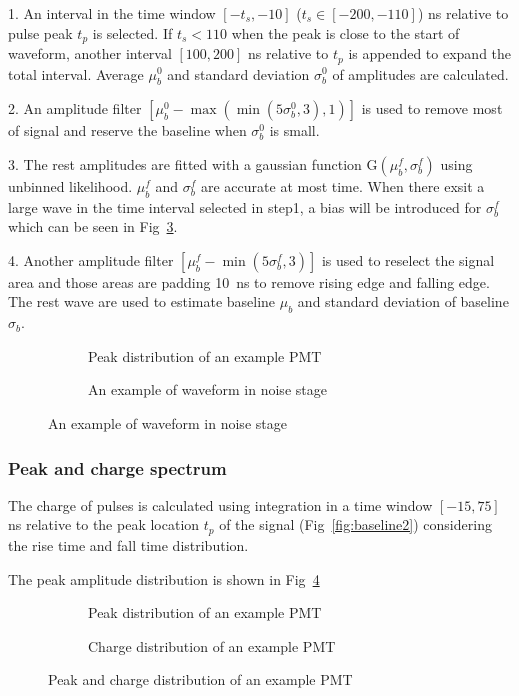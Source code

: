 1. An interval in the time window $[-t_s,-10]$ ($t_s\in[-200,-110]$) ns relative to pulse peak $t_p$ is selected. If $t_s<110$ when the peak is close to the start of waveform, another interval $[100,200]$ ns relative to $t_p$ is appended to expand the total interval. Average $\mu_b^0$ and standard deviation $\sigma_b^0$ of amplitudes are calculated.

2. An amplitude filter $[\mu_b^0-\max(\min(5\sigma_b^0,3),1)]$ is used to remove most of signal and reserve the baseline when $\sigma_b^0$ is small.

3. The rest amplitudes are fitted with a gaussian function G$(\mu_b^f,\sigma_b^f)$ using unbinned likelihood. $\mu_b^f$ and $\sigma_b^f$ are accurate at most time. When there exsit a large wave in the time interval selected in step1, a bias will be introduced for $\sigma_b^f$ which can be seen in Fig~\ref{fig:baselineBias2}.

4. Another amplitude filter $[\mu_b^f-\min(5\sigma_b^f,3)]$ is used to reselect the signal area and those areas are padding \SI{10}{ns} to remove rising edge and falling edge. The rest wave are used to estimate baseline $\mu_b$ and standard deviation of baseline $\sigma_b$.
\begin{figure}
    \centering
    \begin{subfigure}[b]{0.7\textwidth}
        \caption{Peak distribution of an example PMT}%
        \label{fig:baselineBias1}
    \end{subfigure}
    \begin{subfigure}[b]{0.3\textwidth}
        \caption{An example of waveform in noise stage}
        \label{fig:baselineBias2}
    \end{subfigure}
\end{figure}

\subsubsection{Peak and charge spectrum}
\label{sec:noisepeak}
The charge of pulses is calculated using integration in a time window $[-15, 75]$ ns relative to the peak location $t_p$ of the signal (Fig~\ref{fig:baseline2}) considering the rise time and fall time distribution.

The peak amplitude distribution is shown in Fig~\ref{fig:peak}
\begin{figure}[!htbp]
    \centering
    \begin{subfigure}[b]{0.35\textwidth}
        \caption{Peak distribution of an example PMT}%
        \label{fig:peak}
    \end{subfigure}
    \begin{subfigure}[b]{0.35\textwidth}
        \caption{Charge distribution of an example PMT}%
        \label{fig:charge}
    \end{subfigure}
    \caption{Peak and charge distribution of an example PMT}
\end{figure}

